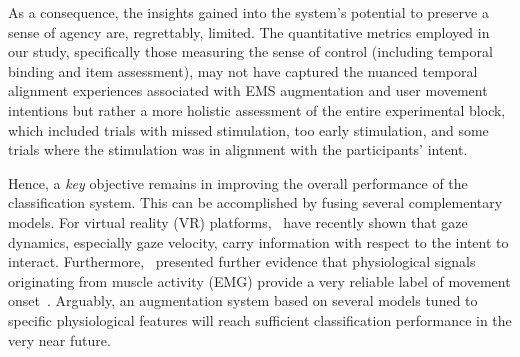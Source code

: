 As a consequence, the insights gained into the system's potential to preserve a sense of agency are, regrettably, limited. The quantitative metrics employed in our study, specifically those measuring the sense of control (including temporal binding and item assessment), may not have captured the nuanced temporal alignment experiences associated with EMS augmentation and user movement intentions but rather a more holistic assessment of the entire experimental block, which included trials with missed stimulation, too early stimulation, and some trials where the stimulation was in alignment with the participants' intent.

Hence, a \textit{key} objective remains in improving the overall performance of the classification system. This can be accomplished by fusing several complementary models. For virtual reality (VR) platforms,~\citet{David-John2021-vg} have recently shown that gaze dynamics, especially gaze velocity, carry information with respect to the intent to interact. Furthermore,~\citet{Nguyen2023-me} presented further evidence that physiological signals originating from muscle activity (EMG) provide a very reliable label of movement onset~\cite{Nguyen2023-me}. Arguably, an augmentation system based on several models tuned to specific physiological features will reach sufficient classification performance in the very near future.

